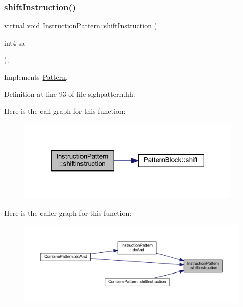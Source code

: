 \subsubsection{\texorpdfstring{shiftInstruction()}{shiftInstruction()}}
{\footnotesize\ttfamily virtual void Instruction\+Pattern\+::shift\+Instruction (\begin{DoxyParamCaption}\item[{int4}]{sa }\end{DoxyParamCaption})\hspace{0.3cm}{\ttfamily [inline]}, {\ttfamily [virtual]}}



Implements \mbox{\hyperlink{class_pattern_a8a84c1487128e33cdc27c2069eb4c02a}{Pattern}}.



Definition at line 93 of file slghpattern.\+hh.

Here is the call graph for this function\+:
\nopagebreak
\begin{figure}[H]
\begin{center}
\leavevmode
\includegraphics[width=306pt]{class_instruction_pattern_a85d29caf8da56fad4bf0805f7fdeb4a8_cgraph}
\end{center}
\end{figure}
Here is the caller graph for this function\+:
\nopagebreak
\begin{figure}[H]
\begin{center}
\leavevmode
\includegraphics[width=350pt]{class_instruction_pattern_a85d29caf8da56fad4bf0805f7fdeb4a8_icgraph}
\end{center}
\end{figure}
\mbox{\label{class_instruction_pattern_ad257e6ff03279c9366d7568b011c72a5}} 
